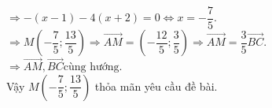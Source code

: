 \begin{bt}
{\begin{enumerate}
			$\Rightarrow -(x-1)-4(x+2)=0 \Leftrightarrow x=-\dfrac{7}{5}$.\\
			$\Rightarrow M \left(-\dfrac{7}{5};\dfrac{13}{5}\right) \Rightarrow \vec{AM} = \left(-\dfrac{12}{5};\dfrac{3}{5}\right)\Rightarrow \vec{AM} =\dfrac{3}{5} \vec{BC}$.\\
			$\Rightarrow \vec{AM},\vec{BC} \text{cùng hướng}$.\\
			Vậy $M \left(-\dfrac{7}{5};\dfrac{13}{5} \right)$ thỏa mãn yêu cầu đề bài.
		\end{enumerate}
	}
\end{bt}


